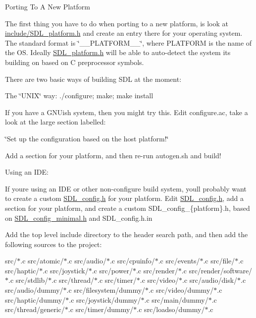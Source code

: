 
\begin{DoxyItemize}
\item Porting To A New Platform

The first thing you have to do when porting to a new platform, is look at \mbox{\hyperlink{_s_d_l__platform_8h}{include/\+S\+D\+L\+\_\+platform.\+h}} and create an entry there for your operating system. The standard format is \char`\"{}\+\_\+\+\_\+\+P\+L\+A\+T\+F\+O\+R\+M\+\_\+\+\_\+\char`\"{}, where P\+L\+A\+T\+F\+O\+RM is the name of the OS. Ideally \mbox{\hyperlink{_s_d_l__platform_8h}{S\+D\+L\+\_\+platform.\+h}} will be able to auto-\/detect the system it\textquotesingle{}s building on based on C preprocessor symbols.
\end{DoxyItemize}

There are two basic ways of building S\+DL at the moment\+:


\begin{DoxyEnumerate}
\item The \char`\"{}\+U\+N\+I\+X\char`\"{} way\+: ./configure; make; make install

If you have a G\+N\+Uish system, then you might try this. Edit configure.\+ac, take a look at the large section labelled\+:

\char`\"{}\+Set up the configuration based on the host platform!\char`\"{}

Add a section for your platform, and then re-\/run autogen.\+sh and build!
\item Using an I\+DE\+:

If you\textquotesingle{}re using an I\+DE or other non-\/configure build system, you\textquotesingle{}ll probably want to create a custom \mbox{\hyperlink{_s_d_l__config_8h_source}{S\+D\+L\+\_\+config.\+h}} for your platform. Edit \mbox{\hyperlink{_s_d_l__config_8h_source}{S\+D\+L\+\_\+config.\+h}}, add a section for your platform, and create a custom S\+D\+L\+\_\+config\+\_\+\{platform\}.h, based on \mbox{\hyperlink{_s_d_l__config__minimal_8h}{S\+D\+L\+\_\+config\+\_\+minimal.\+h}} and S\+D\+L\+\_\+config.\+h.\+in

Add the top level include directory to the header search path, and then add the following sources to the project\+:

src/$\ast$.c src/atomic/$\ast$.c src/audio/$\ast$.c src/cpuinfo/$\ast$.c src/events/$\ast$.c src/file/$\ast$.c src/haptic/$\ast$.c src/joystick/$\ast$.c src/power/$\ast$.c src/render/$\ast$.c src/render/software/$\ast$.c src/stdlib/$\ast$.c src/thread/$\ast$.c src/timer/$\ast$.c src/video/$\ast$.c src/audio/disk/$\ast$.c src/audio/dummy/$\ast$.c src/filesystem/dummy/$\ast$.c src/video/dummy/$\ast$.c src/haptic/dummy/$\ast$.c src/joystick/dummy/$\ast$.c src/main/dummy/$\ast$.c src/thread/generic/$\ast$.c src/timer/dummy/$\ast$.c src/loadso/dummy/$\ast$.c
\end{DoxyEnumerate}

